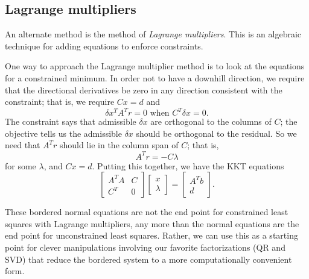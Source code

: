 \subsection{Lagrange multipliers}

An alternate method is the method of {\em Lagrange multipliers}.
This is an algebraic technique for adding equations to enforce constraints.

One way to approach the Lagrange multiplier method is to look at the
equations for a constrained minimum.  In order not to have a downhill
direction, we require that the directional derivatives be zero in any
direction consistent with the constraint; that is, we require $Cx = d$
and
\[
  \delta x^T A^T r = 0 \mbox{ when } C^T \delta x = 0.
\]
The constraint says that admissible $\delta x$ are
orthogonal to the columns of $C$; the objective tells us the admissible
$\delta x$ should be orthogonal to the residual.  So we need that $A^T r$
should lie in the column span of $C$; that is,
\[
  A^T r = -C \lambda
\]
for some $\lambda$, and $Cx = d$.  Putting this together,
we have the KKT equations
\[
  \begin{bmatrix}
    A^T A & C \\
    C^T & 0
  \end{bmatrix}
  \begin{bmatrix} x \\ \lambda \end{bmatrix} =
  \begin{bmatrix} A^T b \\ d \end{bmatrix}.
\]

These bordered normal equations are not the end point for constrained
least squares  with Lagrange multipliers, any more than the normal
equations are the end point for unconstrained least squares.  Rather,
we can use this as a starting point for clever manipulations involving
our favorite factorizations (QR and SVD) that reduce the bordered system
to a more computationally convenient form.
